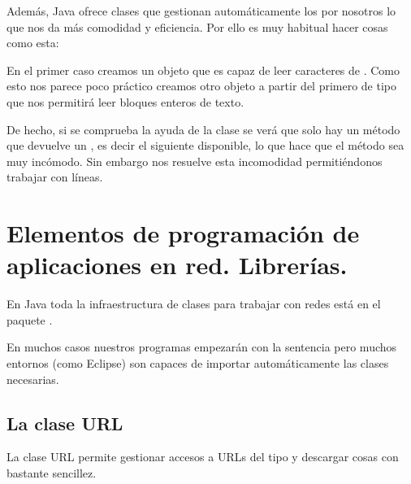 \documentclass[letterpaper,10pt,spanish]{sphinxmanual}
\begin{document}
Además, Java ofrece clases que gestionan automáticamente los  por nosotros lo que nos da más comodidad y eficiencia. Por ello es muy habitual hacer cosas como esta:

\begin{sphinxVerbatim}[commandchars=\\\{\}]
  
         
  
         
\end{sphinxVerbatim}

En el primer caso creamos un objeto  que es capaz de leer caracteres de . Como esto nos parece poco práctico creamos otro objeto a partir del primero de tipo  que nos permitirá leer bloques enteros de texto.

De hecho, si se comprueba la ayuda de la clase  se verá que solo hay un método  que devuelve un , es decir el siguiente  disponible, lo que hace que el método sea muy incómodo. Sin embargo  nos resuelve esta incomodidad permitiéndonos trabajar con líneas.


\section{Elementos de programación de aplicaciones en red. Librerías.}
\label{\detokenize{textos/tema3:elementos-de-programacion-de-aplicaciones-en-red-librerias}}
En Java toda la infraestructura de clases para trabajar con redes está en el paquete .

En muchos casos nuestros programas empezarán con la sentencia  pero muchos entornos (como Eclipse) son capaces de importar automáticamente las clases necesarias.


\subsection{La clase URL}
\label{\detokenize{textos/tema3:la-clase-url}}
La clase URL permite gestionar accesos a URLs del tipo  y descargar cosas con bastante sencillez.
\end{document}
